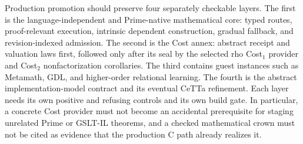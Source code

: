 \documentclass[11pt]{article}
\begin{document}
Production promotion should preserve four separately checkable layers.  The
first is the language-independent and Prime-native mathematical core: typed
routes, proof-relevant execution, intrinsic dependent construction, gradual
fallback, and revision-indexed admission.  The second is the Cost annex:
abstract receipt and valuation laws first, followed only after its seal by the
selected rho Cost$_1$ provider and Cost$_2$ nonfactorization corollaries.  The
third contains guest instances such as Metamath, GDL, and higher-order
relational learning.  The fourth is the abstract implementation-model contract
and its eventual CeTTa refinement.  Each layer needs its own positive and
refusing controls and its own build gate.  In particular, a concrete Cost
provider must not become an accidental prerequisite for staging unrelated
Prime or GSLT-IL theorems, and a checked mathematical crown must not be cited as
evidence that the production C path already realizes it.
\end{document}
